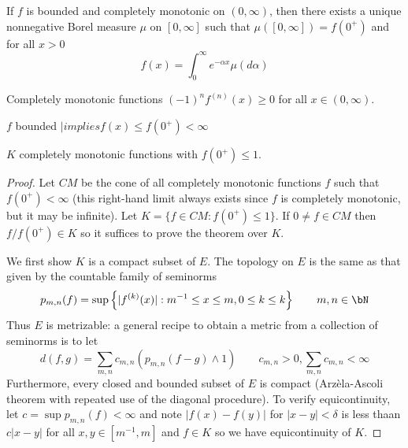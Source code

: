 
\begin{theorem}
  If $f$ is bounded and completely monotonic on $(0, \infty)$,
  then there exists a unique nonnegative Borel measure
  $\mu$ on $[0, \infty]$ such that
  $\mu([0,\infty]) = f(0^+)$ and for all $x > 0$
  \[
    f(x) = \int_0^\infty e^{-\alpha x} \mu(d\alpha)
  \]
\end{theorem}

Completely monotonic functions $(-1)^n f^{(n)}(x) \geq 0$ for all
$x \in (0, \infty)$.

$f$ bounded $|implies f(x) \leq f(0^+) < \infty$

$K$ completely monotonic functions with $f(0^+) \leq 1$.

\begin{proof}
  Let $CM$ be the cone of all completely monotonic functions $f$
  such that $f(0^+) < \infty$ (this right-hand limit always exists
  since $f$ is completely monotonic, but it may be infinite).
  Let $K  = \{f \in CM : f(0^+) \leq 1 \}$.
  If $0 \neq f \in CM$ then $f / f(0^+) \in K$ so it suffices to
  prove the theorem over $K$.

  We first show $K$ is a compact subset of $E$. The topology on $E$ is the
  same as that given by the countable family of seminorms
  \[
    p_{m,n}(f) = \sup\left\{ \lvert f^{(k)}(x) \rvert : m^{-1} \leq x \leq m, 0 \leq k \leq k \right\}
    \qquad m,n \in \bN
  \]
  Thus $E$ is metrizable: a general recipe to obtain a metric from a collection
  of seminorms is to let
  \[
    d(f,g) = \sum_{m,n} c_{m,n} \left( p_{m,n}(f - g) \land 1 \right)
    \qquad c_{m,n} > 0, \sum_{m,n} c_{m,n} < \infty
  \]
  Furthermore, every closed and bounded subset of $E$ is compact
  (Arz\`ela-Ascoli theorem with repeated use of the diagonal procedure).
  To verify equicontinuity,
  let $c = \sup p_{m,n}(f) < \infty$ and
  note $\lvert f(x) - f(y) \rvert$ for $\lvert x - y \rvert < \delta$
  is less thaan $c \lvert x - y \rvert$ for all $x,y \in [m^{-1}, m]$ and
  $f \in K$ so we have equicontinuity of $K$.


\end{proof}
